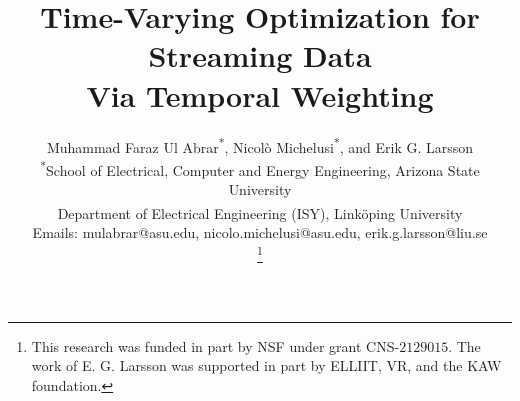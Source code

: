 \documentclass[conference]{IEEEtran}
\newcommand{\nm}[1]{\textcolor{magenta}{\bf [NM: #1]}}
\begin{document}
\title{Time-Varying Optimization for Streaming Data \\Via Temporal Weighting}


\author{%
  Muhammad Faraz Ul Abrar\textsuperscript{*}, 
  Nicol\`{o} Michelusi\textsuperscript{*}, 
  and Erik G. Larsson\textsuperscript{\dag} \\[1ex]
  \textsuperscript{*}School of Electrical, Computer and Energy Engineering, Arizona State University\\
  \textsuperscript{\dag}Department of Electrical Engineering (ISY), Link\"oping University\\[1ex]
  Emails: {mulabrar@asu.edu, nicolo.michelusi@asu.edu, 
                   erik.g.larsson@liu.se}
                   
\thanks{This research was funded in part by NSF under grant CNS-$2129015$. The work of E. G. Larsson was supported in part by ELLIIT, VR, and the KAW foundation. }}

\maketitle
{}
\end{document}
